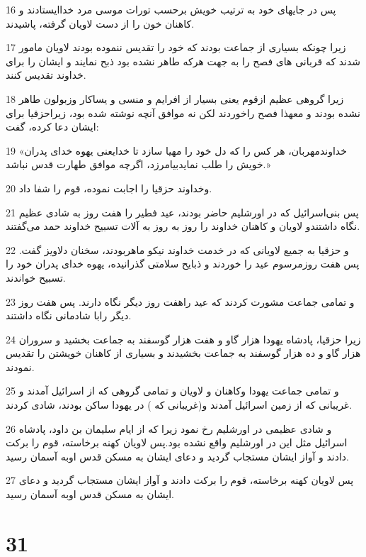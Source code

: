 \par 16 پس در جایهای خود به ترتیب خویش برحسب تورات موسی مرد خداایستادند و کاهنان خون را از دست لاویان گرفته، پاشیدند.
\par 17 زیرا چونکه بسیاری از جماعت بودند که خود را تقدیس ننموده بودند لاویان مامور شدند که قربانی های فصح را به جهت هرکه طاهر نشده بود ذبح نمایند و ایشان را برای خداوند تقدیس کنند.
\par 18 زیرا گروهی عظیم ازقوم یعنی بسیار از افرایم و منسی و یساکار وزبولون طاهر نشده بودند و معهذا فصح راخوردند لکن نه موافق آنچه نوشته شده بود، زیراحزقیا برای ایشان دعا کرده، گفت:
\par 19 «خداوندمهربان، هر کس را که دل خود را مهیا سازد تا خدایعنی یهوه خدای پدران خویش را طلب نمایدبیامرزد، اگرچه موافق طهارت قدس نباشد.»
\par 20 وخداوند حزقیا را اجابت نموده، قوم را شفا داد.
\par 21 پس بنی‌اسرائیل که در اورشلیم حاضر بودند، عید فطیر را هفت روز به شادی عظیم نگاه داشتندو لاویان و کاهنان خداوند را روز به روز به آلات تسبیح خداوند حمد می‌گفتند.
\par 22 و حزقیا به جمیع لاویانی که در خدمت خداوند نیکو ماهربودند، سخنان دلاویز گفت. پس هفت روزمرسوم عید را خوردند و ذبایح سلامتی گذرانیده، یهوه خدای پدران خود را تسبیح خواندند.
\par 23 و تمامی جماعت مشورت کردند که عید راهفت روز دیگر نگاه دارند. پس هفت روز دیگر رابا شادمانی نگاه داشتند.
\par 24 زیرا حزقیا، پادشاه یهودا هزار گاو و هفت هزار گوسفند به جماعت بخشید و سروران هزار گاو و ده هزار گوسفند به جماعت بخشیدند و بسیاری از کاهنان خویشتن را تقدیس نمودند.
\par 25 و تمامی جماعت یهودا وکاهنان و لاویان و تمامی گروهی که از اسرائیل آمدند و غریبانی که از زمین اسرائیل آمدند و(غریبانی که ) در یهودا ساکن بودند، شادی کردند.
\par 26 و شادی عظیمی در اورشلیم رخ نمود زیرا که از ایام سلیمان بن داود، پادشاه اسرائیل مثل این در اورشلیم واقع نشده بود.پس لاویان کهنه برخاسته، قوم را برکت دادند و آواز ایشان مستجاب گردید و دعای ایشان به مسکن قدس اوبه آسمان رسید.
\par 27 پس لاویان کهنه برخاسته، قوم را برکت دادند و آواز ایشان مستجاب گردید و دعای ایشان به مسکن قدس اوبه آسمان رسید.
 
\chapter{31}

